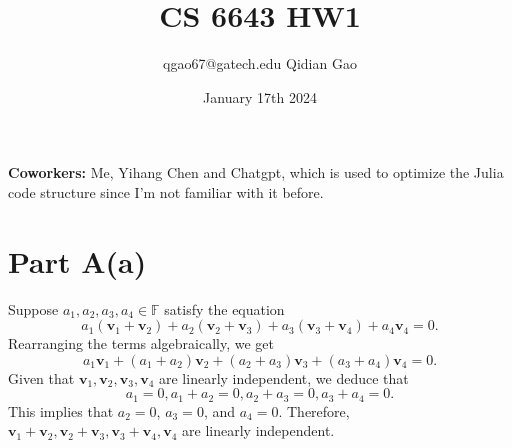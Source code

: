 \documentclass{article}
\title{CS 6643 HW1}
\author{qgao67@gatech.edu Qidian Gao}
\date{January 17th 2024}
\begin{document}
\maketitle
\textbf{Coworkers:} Me, Yihang Chen and Chatgpt, which is used to optimize the Julia code structure since I'm not familiar with it before.
\section{Part A(a)}
Suppose \(a_1, a_2, a_3, a_4 \in \mathbb{F}\) satisfy the equation
\[
a_1(\boldsymbol{v}_1 + \boldsymbol{v}_2) + a_2(\boldsymbol{v}_2 + \boldsymbol{v}_3) + a_3(\boldsymbol{v}_3 + \boldsymbol{v}_4) + a_4\boldsymbol{v}_4 = 0.
\]
Rearranging the terms algebraically, we get
\[
a_1\boldsymbol{v}_1 + (a_1 + a_2)\boldsymbol{v}_2 + (a_2 + a_3)\boldsymbol{v}_3 + (a_3 + a_4)\boldsymbol{v}_4 = 0.
\]
Given that \(\boldsymbol{v}_1, \boldsymbol{v}_2, \boldsymbol{v}_3, \boldsymbol{v}_4\) are linearly independent, we deduce that
\[
a_1 = 0, a_1 + a_2 = 0, a_2 + a_3 = 0, a_3 + a_4 = 0.
\]
This implies that \(a_2 = 0\), \(a_3 = 0\), and \(a_4 = 0\). Therefore, \(\boldsymbol{v}_1 + \boldsymbol{v}_2, \boldsymbol{v}_2 + \boldsymbol{v}_3, \boldsymbol{v}_3 + \boldsymbol{v}_4, \boldsymbol{v}_4\) are linearly independent.
\end{document}
